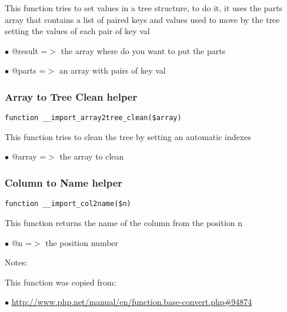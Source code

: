 \documentclass[a4paper]{article}
\def\htmladdnormallink#1#2{\href{#2}{#1}}
\begin{document}
This function tries to set values in a tree structure, to do it, it uses
the parts array that contains a list of paired keys and values used to move
by the tree setting the values of each pair of key val

\begin{compactitem}
\item[\color{myblue}$\bullet$] @result =$>$ the array where do you want to put the parts
\item[\color{myblue}$\bullet$] @parts  =$>$ an array with pairs of key val
\end{compactitem}

\hypertarget{toc476}{}
\subsubsection{Array to Tree Clean helper}

\begin{lstlisting}
function __import_array2tree_clean($array)
\end{lstlisting}

This function tries to clean the tree by setting an automatic indexes

\begin{compactitem}
\item[\color{myblue}$\bullet$] @array =$>$ the array to clean
\end{compactitem}

\hypertarget{toc477}{}
\subsubsection{Column to Name helper}

\begin{lstlisting}
function __import_col2name($n)
\end{lstlisting}

This function returns the name of the column from the position n

\begin{compactitem}
\item[\color{myblue}$\bullet$] @n =$>$ the position number
\end{compactitem}

Notes:

This function was copied from:

\begin{compactitem}
\item[\color{myblue}$\bullet$] \htmladdnormallink{http://www.php.net/manual/en/function.base-convert.php\#94874}{http://www.php.net/manual/en/function.base-convert.php\#94874}
\end{compactitem}
\end{document}
